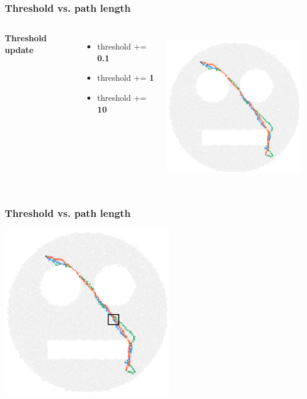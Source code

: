 \documentclass{beamer}
\begin{document}
\begin{frame}
\frametitle{Threshold vs. path length}
\begin{columns}[c] %
\textbf{Threshold update}
\begin{itemize}
\item \textcolor{0.1}{threshold += \textbf{0.1}}
\item \textcolor{1}{threshold += \textbf{1}}
\item \textcolor{10}{threshold += \textbf{10}}
\end{itemize}

\begin{center}
	\includegraphics[height=190pt]{smileygraph.png}
\end{center}
\end{columns}
\end{frame}

\begin{frame}
\frametitle{Threshold vs. path length}
\begin{center}
	\includegraphics[height=210pt]{smileygraph_zoom.png}
\end{center}
\end{frame}
\end{document}
